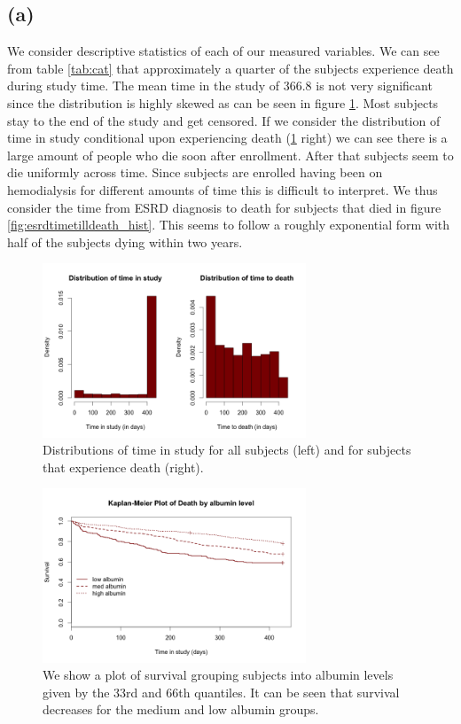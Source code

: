 \documentclass[paper=a4, fontsize=11pt]{scrartcl} %
\numberwithin{equation}{section} %
\numberwithin{figure}{section} %
\numberwithin{table}{section} %
\begin{document}
\subsection{(a)}
\label{sec:results_a}
We consider descriptive statistics of each of our measured variables. We can see from table \ref{tab:cat} that approximately a quarter of the subjects experience death during study time. The mean time in the study of 366.8 is not very significant since the distribution is highly skewed as can be seen in figure \ref{fig:timeinstudy_hist}. Most subjects stay to the end of the study and get censored. If we consider the distribution of time in study conditional upon experiencing death (\ref{fig:timeinstudy_hist} right) we can see there is a large amount of people who die soon after enrollment. After that subjects seem to die uniformly across time. Since subjects are enrolled having been on hemodialysis for different amounts of time this is difficult to interpret. We thus consider the time from ESRD diagnosis to death for subjects that died in figure \ref{fig:esrdtimetilldeath_hist}. This seems to follow a roughly exponential form with half of the subjects dying within two years.

\begin{figure}[H]
\centering
\includegraphics[width=0.7\textwidth]{plots/timeinstudy_hist.png}
\caption{Distributions of time in study for all subjects (left) and for subjects that experience death (right).}
\label{fig:timeinstudy_hist}
\end{figure}

\begin{figure}[H]
\centering
\includegraphics[width=0.7\textwidth]{plots/death_km.png}
\caption{We show a plot of survival grouping subjects into albumin levels given by the 33rd and 66th quantiles. It can be seen that survival decreases for the medium and low albumin groups.}
\label{fig:death_km}
\end{figure}
\end{document}

